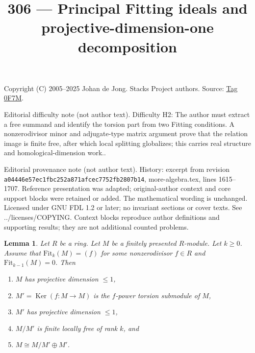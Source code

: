 \documentclass{amsart}
\theoremstyle{plain}
\newtheorem{lemma}[subsection]{Lemma}
\theoremstyle{definition}
\theoremstyle{remark}
\numberwithin{equation}{subsection}
\def\Ker{\mathop{\mathrm{Ker}}}
\begin{document}
\title[Stacks Project, Tag 0F7M]{306 --- Principal Fitting ideals and projective-dimension-one decomposition}
\maketitle
\noindent Copyright (C) 2005--2025 Johan de Jong. Stacks Project authors. Source: \href{https://stacks.math.columbia.edu/tag/0F7M}{Tag 0F7M}.

\noindent Editorial difficulty note (not author text). Difficulty H2: The author must extract a free summand and identify the torsion part from two Fitting conditions. A nonzerodivisor minor and adjugate-type matrix argument prove that the relation image is finite free, after which local splitting globalizes; this carries real structure and homological-dimension work..

\noindent Editorial provenance note (not author text). History: excerpt from revision \texttt{a0444\allowbreak 6e57e\allowbreak c1fbc\allowbreak 252a8\allowbreak 71afc\allowbreak ec775\allowbreak 2fb28\allowbreak 07b14}, more-algebra.tex, lines 1615--1707. Reference presentation was adapted; original-author context and core support blocks were retained or added. The mathematical wording is unchanged. Licensed under GNU FDL 1.2 or later; no invariant sections or cover texts. See ../licenses/COPYING. Context blocks reproduce author definitions and supporting results; they are not additional counted problems.

\begin{lemma}
\label{lemma-fitting-ideals-and-pd1}
Let $R$ be a ring. Let $M$ be a finitely presented $R$-module. Let $k \geq 0$.
Assume that $\text{Fit}_k(M) = (f)$ for some nonzerodivisor $f \in R$
and $\text{Fit}_{k - 1}(M) = 0$. Then
\begin{enumerate}
\item $M$ has projective dimension $\leq 1$,
\item $M' = \Ker(f : M \to M)$ is the $f$-power torsion submodule of $M$,
\item $M'$ has projective dimension $\leq 1$,
\item $M/M'$ is finite locally free of rank $k$, and
\item $M \cong M/M' \oplus M'$.
\end{enumerate}
\end{lemma}
\end{document}
